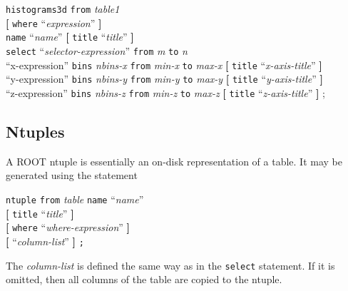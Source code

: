 \documentclass[12pt]{article}
\begin{document}
\begin{flushleft}
{\tt histograms3d} {\tt from} {\em table1} \\
\hspace{1cm}  {\bf[} {\tt where} ``{\em expression}'' {\bf]} \\
\hspace{1cm}  {\tt name} ``{\em name}'' {\bf[} {\tt title} ``{\em title}'' {\bf]} \\
\hspace{1cm}  {\tt select} ``{\em selector-expression}'' {\tt from} {\em m} {\tt to} {\em n} \\ 
\hspace{1cm}  ``x-expression'' {\tt bins} {\em nbins-x} {\tt from} {\em min-x} {\tt to} {\em max-x} {\bf[} {\tt title}  ``{\em x-axis-title}'' {\bf]} \\
\hspace{1cm}  ``y-expression'' {\tt bins} {\em nbins-y} {\tt from} {\em min-y} {\tt to} {\em max-y} {\bf[} {\tt title}  ``{\em y-axis-title}'' {\bf]} \\
\hspace{1cm}  ``z-expression'' {\tt bins} {\em nbins-z} {\tt from} {\em min-z} {\tt to} {\em max-z} {\bf[} {\tt title}  ``{\em z-axis-title}'' {\bf]} ;
\end{flushleft}
\vspace{5mm}

\subsection{Ntuples}

A ROOT ntuple is essentially an on-disk representation of a table.  
It may be generated using the statement

\begin{flushleft}
{\tt ntuple} {\tt from} {\em table} {\tt name} ``{\em name}'' \\
\hspace{1cm} {\bf[} {\tt title} ``{\em title}'' {\bf]} \\
\hspace{1cm} {\bf[} {\tt where} ``{\em where-expression}'' {\bf]} \\
\hspace{1cm} {\bf[} ``{\em column-list}'' {\bf]} {\tt ;}
\end{flushleft}

The {\em column-list} is defined the same way as in the {\tt select} statement.
If it is omitted, then all columns of the table are copied to the ntuple.
\end{document}
